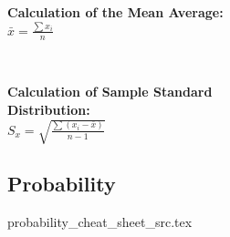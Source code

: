 
\begin{minipage}{\textwidth}
    \textbf{Calculation of the Mean Average:}
    \\ \( \bar{ x } = \displaystyle\frac{ \displaystyle\sum{ x_i } }{ n } \)
\end{minipage}
\\ \begin{minipage}{\textwidth}
    \textbf{Calculation of Sample Standard \\Distribution:}
    \\ \( S_x = \sqrt{ \frac{ \displaystyle\sum{ ( x_i - \bar{ x } ) } }{ n - 1 } } \)
\end{minipage}

\subsection*{Probability}
{probability_cheat_sheet_src.tex}